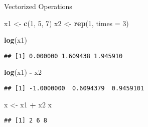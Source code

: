 \documentclass[ignorenonframetext,]{beamer}
\newenvironment{Shaded}{\begin{snugshade}}{\end{snugshade}}
\newcommand{\DataTypeTok}[1]{\textcolor[rgb]{0.13,0.29,0.53}{#1}}
\newcommand{\DecValTok}[1]{\textcolor[rgb]{0.00,0.00,0.81}{#1}}
\newcommand{\KeywordTok}[1]{\textcolor[rgb]{0.13,0.29,0.53}{\textbf{#1}}}
\newcommand{\NormalTok}[1]{#1}
\newcommand{\OperatorTok}[1]{\textcolor[rgb]{0.81,0.36,0.00}{\textbf{#1}}}
\newcommand{\StringTok}[1]{\textcolor[rgb]{0.31,0.60,0.02}{#1}}
\begin{document}
\begin{frame}[fragile]{Vectorized Operations}
\protect\hypertarget{vectorized-operations-4}{}

\begin{Shaded}
\begin{Highlighting}[]
\NormalTok{x1 <-}\StringTok{ }\KeywordTok{c}\NormalTok{(}\DecValTok{1}\NormalTok{, }\DecValTok{5}\NormalTok{, }\DecValTok{7}\NormalTok{)}
\NormalTok{x2 <-}\StringTok{ }\KeywordTok{rep}\NormalTok{(}\DecValTok{1}\NormalTok{, }\DataTypeTok{times =} \DecValTok{3}\NormalTok{)}

\KeywordTok{log}\NormalTok{(x1)}
\end{Highlighting}
\end{Shaded}

\begin{verbatim}
## [1] 0.000000 1.609438 1.945910
\end{verbatim}

\begin{Shaded}
\begin{Highlighting}[]
\KeywordTok{log}\NormalTok{(x1) }\OperatorTok{-}\StringTok{ }\NormalTok{x2}
\end{Highlighting}
\end{Shaded}

\begin{verbatim}
## [1] -1.0000000  0.6094379  0.9459101
\end{verbatim}

\begin{Shaded}
\begin{Highlighting}[]
\NormalTok{x <-}\StringTok{ }\NormalTok{x1 }\OperatorTok{+}\StringTok{ }\NormalTok{x2}
\NormalTok{x}
\end{Highlighting}
\end{Shaded}

\begin{verbatim}
## [1] 2 6 8
\end{verbatim}

\end{frame}
\end{document}
